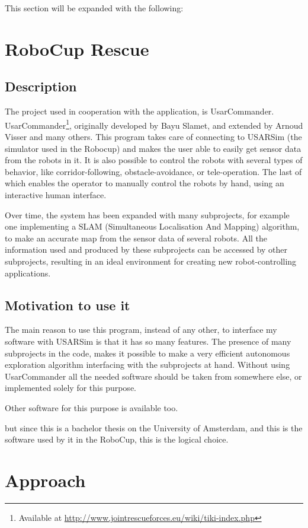 \documentclass[a4paper,10pt]{article}
\begin{document}
This section will be expanded with the following: 

\section{RoboCup Rescue}
\subsection{Description}
The project used in cooperation with the application, is UsarCommander.
UsarCommander\footnote{Available at
\url{http://www.jointrescueforces.eu/wiki/tiki-index.php}}, originally developed by Bayu Slamet, and extended by Arnoud
Visser and many others. This program takes care of connecting to USARSim (the
simulator used in the Robocup) and
makes the user able to easily get sensor data from the robots in it. It is also
possible to control the robots with several types of behavior, like
corridor-following, obstacle-avoidance, or tele-operation. The last of which
enables the operator to manually control the robots by hand, using an
interactive human interface.

Over time, the system has been expanded with many subprojects, for example one
implementing a SLAM
(Simultaneous Localisation And Mapping) algorithm, to make an accurate map from
the sensor data of several robots\cite{slamet2006manifoldslam}. All the information used and produced by
these subprojects can be accessed by other subprojects, resulting in an ideal
environment for creating new robot-controlling applications.

\subsection{Motivation to use it}
The main reason to use this program, instead of any other, to interface my
software with USARSim is that it has so many features. The presence of many
subprojects in the code, makes it possible to make a very efficient autonomous
exploration algorithm interfacing with the subprojects at hand. Without using UsarCommander all
the needed software should be taken from somewhere else, or implemented solely
for this purpose.

Other software for this purpose is available too. %

but since this is a bachelor
thesis on the University of Amsterdam, and this is the software used by it in
the RoboCup, this is the logical choice.
\section{Approach}

\end{document}
